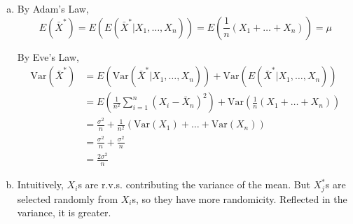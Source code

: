 \documentclass[10.5pt]{article}
\begin{document}
\begin{enumerate}[(a)]
\item 	

By Adam's Law, $$E(\bar{X}^*) = E(E(\bar{X}^*|X_1, \dots, X_n)) = E\left(\frac{1}{n}(X_1+\dots+X_n)\right) = \mu$$

By Eve's Law, \begin{align*}
	\text{Var}(\bar{X}^*) &= E(\text{Var}(\bar{X}^*|X_1, \dots, X_n))+\text{Var}(E(\bar{X}^*|X_1, \dots, X_n))\\[8pt]
						&= E\left(\frac{1}{n^2}\sum_{i = 1}^n(X_i - \bar{X}_n)^2\right)+\text{Var}\left(\frac{1}{n}(X_1+\dots+X_n)\right)\\[8pt]
						&= \frac{\sigma^2}{n}+\frac{1}{n^2}(\text{Var}(X_1)+\dots+\text{Var}(X_n))\\[8pt]
						&= \frac{\sigma^2}{n}+\frac{\sigma^2}{n}\\[8pt]
						&=\frac{2\sigma^2}{n}
\end{align*}

\item Intuitively, $X_i$s are r.v.s. contributing the variance of the mean. But $X_j^*$s are selected randomly from $X_i$s, so they have more randomicity. Reflected in the variance, it is greater.


\end{enumerate}
\end{document}
